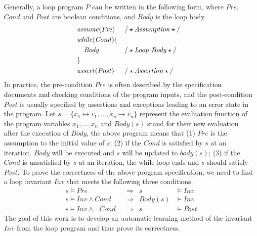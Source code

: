 Generally, a loop program $P$ can be written in the following form, 
where $\mathit{Pre}$, $\mathit{Cond}$ and $\mathit{Post}$ are boolean conditions, 
and $\mathit{Body}$ is the loop body. 
\begin{align*}
&\mathit{assume}(\mathit{Pre}) & & /\star\text{\emph{Assumption}}\star/ \\
&\mathit{while} (\mathit{Cond}) \{ && \\
&\quad \mathit{Body} & & /\star\text{\emph{Loop Body}}\star/ \\
&\} && \\
&\mathit{assert}(\mathit{Post}) & & /\star\text{\emph{Assertion}}\star/ 
\end{align*}
In practice, the pre-condition $\mathit{Pre}$ is often described by 
the specification documents and checking conditions of the program inputs, 
and the post-condition $\mathit{Post}$ is usually specified 
by assertions and exceptions leading to an error state in the program. 
Let $s = \{ x_1 \mapsto v_1, \ldots, x_n \mapsto v_n \}$ represent 
the evaluation function of the program variables $x_1, \ldots, x_n$
and $\mathit{Body}(s)$ stand for their new evaluation after the execution of $\mathit{Body}$, 
the above program means that (1) $\mathit{Pre}$ is the assumption to the initial value of $s$; 
(2) if the $\mathit{Cond}$ is satisfied by $s$ at an iteration, 
$\mathit{Body}$ will be executed and $s$ will be updated to $\mathit{body}(s)$; 
(3) if the $\mathit{Cond}$ is unsatisfied by $s$ at an iteration, 
the while-loop ends and $s$ should satisfy $\mathit{Post}$. 
To prove the correctness of the above program specification, 
we need to find a loop invariant $\mathit{Inv}$ that meets the following three conditions. 
\begin{align}
    &s \models \mathit{Pre} 
        &&\Longrightarrow & s &\models \mathit{Inv} \label{inv:pre} \\
    &s \models \mathit{Inv} \wedge \mathit{Cond} 
        &&\Longrightarrow & \mathit{Body}(s) &\models \mathit{Inv} \label{inv:loop} \\
    &s \models \mathit{Inv} \wedge \neg\mathit{Cond} 
        &&\Longrightarrow & s &\models \mathit{Post} \label{inv:post}
\end{align}
The goal of this work is to develop an  automatic learning method of 
the invariant $\mathit{Inv}$ from the loop program and thus prove its correctness. 

